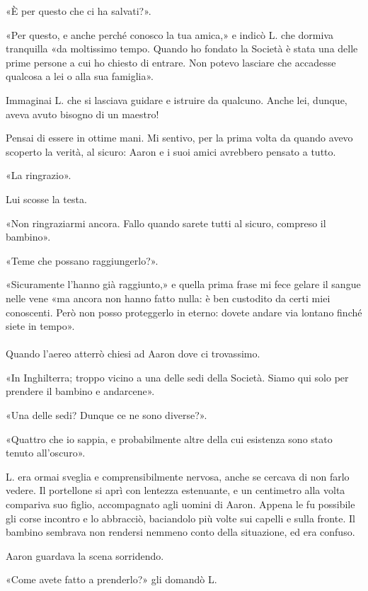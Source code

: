 \documentclass[a4paper,12pt]{book}
\begin{document}
«È per questo che ci ha salvati?».

«Per questo, e anche perché conosco la tua amica,» e indicò L. che dormiva
tranquilla «da moltissimo tempo. Quando ho fondato la Società è stata una delle
prime persone a cui ho chiesto di entrare. Non potevo lasciare che accadesse
qualcosa a lei o alla sua famiglia».

Immaginai L. che si lasciava guidare e istruire da qualcuno. Anche lei, dunque,
aveva avuto bisogno di un maestro!

Pensai di essere in ottime mani. Mi sentivo, per la prima volta da quando avevo
scoperto la verità, al sicuro: Aaron e i suoi amici avrebbero pensato a tutto.

«La ringrazio».

Lui scosse la testa.

«Non ringraziarmi ancora. Fallo quando sarete tutti al sicuro, compreso il
bambino».

«Teme che possano raggiungerlo?».

«Sicuramente l'hanno già raggiunto,» e quella prima frase mi fece gelare il
sangue nelle vene «ma ancora non hanno fatto nulla: è ben custodito da certi
miei conoscenti. Però non posso proteggerlo in eterno: dovete andare via
lontano finché siete in tempo».

\paragraph{}
Quando l'aereo atterrò chiesi ad Aaron dove ci trovassimo.

«In Inghilterra; troppo vicino a una delle sedi della Società. Siamo qui solo
per prendere il bambino e andarcene».

«Una delle sedi? Dunque ce ne sono diverse?».

«Quattro che io sappia, e probabilmente altre della cui esistenza sono stato
tenuto all'oscuro».

L. era ormai sveglia e comprensibilmente nervosa, anche se cercava di non farlo
vedere. Il portellone si aprì con lentezza estenuante, e un centimetro alla
volta compariva suo figlio, accompagnato agli uomini di Aaron. Appena le fu
possibile gli corse incontro e lo abbracciò, baciandolo più volte sui capelli e
sulla fronte. Il bambino sembrava non rendersi nemmeno conto della situazione,
ed era confuso.

Aaron guardava la scena sorridendo.

«Come avete fatto a prenderlo?» gli domandò L.
\end{document}
